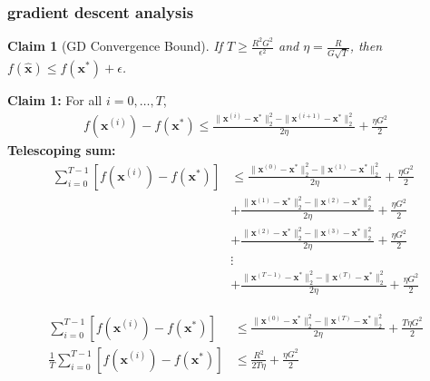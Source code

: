 \documentclass[compress]{beamer}
\newcommand{\bv}[1]{\mathbf{#1}}
\newtheorem{claim}[theorem]{Claim}
\begin{document}
%

\begin{frame}[t]
	\frametitle{gradient descent analysis}
	\footnotesize
	\begin{claim}[GD Convergence Bound]
		If $T \geq \frac{R^2G^2}{\epsilon^2}$ and $\eta = \frac{R}{G\sqrt{T}}$, then $f(\bv{\hat{x}}) \leq f(\bv{x}^*) + \epsilon$.
	\end{claim}
	\textbf{Claim 1:} For all $i = 0, \ldots, T$, 
	\begin{align*}
		f(\bv{x}^{(i)}) - f(\bv{x}^*) \leq \frac{\|\bv{x}^{(i)} - \bv{x}^*\|_2^2 - \|\bv{x}^{(i+1)} - \bv{x}^*\|_2^2}{2\eta} + \frac{\eta G^2}{2}
	\end{align*}
	\textbf{Telescoping sum:}
	\begin{align*}
		\sum_{i=0}^{T-1}\left[f(\bv{x}^{(i)}) - f(\bv{x}^*)\right] &\leq \frac{\|\bv{x}^{(0)} - \bv{x}^*\|_2^2 - \|\bv{x}^{(1)} - \bv{x}^*\|_2^2}{2\eta} + \frac{\eta G^2}{2}\\
		&+ \frac{\|\bv{x}^{(1)} - \bv{x}^*\|_2^2 - \|\bv{x}^{(2)} - \bv{x}^*\|_2^2}{2\eta} + \frac{\eta G^2}{2}\\
		&+ \frac{\|\bv{x}^{(2)} - \bv{x}^*\|_2^2 - \|\bv{x}^{(3)} - \bv{x}^*\|_2^2}{2\eta} + \frac{\eta G^2}{2}\\
		&\vdots\\
		&+ \frac{\|\bv{x}^{(T-1)} - \bv{x}^*\|_2^2 - \|\bv{x}^{(T)} - \bv{x}^*\|_2^2}{2\eta} + \frac{\eta G^2}{2}
	\end{align*}
	
	\begin{align*}
		\sum_{i=0}^{T-1}\left[f(\bv{x}^{(i)}) - f(\bv{x}^*)\right] &\leq \frac{\|\bv{x}^{(0)} - \bv{x}^*\|_2^2 - \|\bv{x}^{(T)} - \bv{x}^*\|_2^2}{2\eta} + \frac{T\eta G^2}{2}\\
		\frac{1}{T}\sum_{i=0}^{T-1}\left[f(\bv{x}^{(i)}) - f(\bv{x}^*)\right] &\leq \frac{R^2}{2T\eta} + \frac{\eta G^2}{2}
	\end{align*}
\end{frame}
\end{document}
